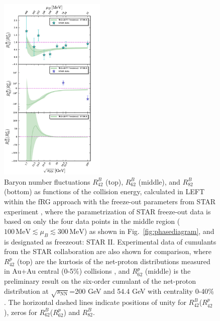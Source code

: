 \documentclass[%
reprint,
superscriptaddress,
showpacs,preprintnumbers,
 amsmath,amssymb,
 aps,
prd,
]{revtex4-1}
\def\Fig#1{Fig.~\ref{#1}} \def\Tab#1{Tab.~\ref{#1}}
\begin{document}
%
\begin{figure}[t]
\includegraphics[width=0.45\textwidth]{Rm2-sqrtS2}
\caption{Baryon number fluctuations $R^{B}_{42}$ (top), $R^{B}_{62}$ (middle), and $R^{B}_{82}$ (bottom) as functions of the collision energy, calculated in LEFT within the fRG approach with the freeze-out parameters from STAR experiment \cite{Adamczyk:2017iwn}, where the parametrization of STAR freeze-out data is based on only the four data points in the middle region ($100\,\mathrm{MeV}\lesssim\mu_B\lesssim 300\,\mathrm{MeV}$) as shown in \Fig{fig:phasediagram}, and is designated as freezeout: STAR II. Experimental data of cumulants from the STAR collaboration are also shown for comparison, where $R^{p}_{42}$ (top) are the kurtosis of the net-proton distributions measured in Au+Au central (0-5\%) collisions \cite{Adam:2020unf}, and $R^{p}_{62}$ (middle) is the preliminary result on the six-order cumulant of the net-proton distribution at $\sqrt{s_{\mathrm{NN}}}$=200 GeV and 54.4 GeV with centrality 0-40\% \cite{Nonaka:2020crv,Pandav:2020uzx}. The horizontal dashed lines indicate positions of unity for $R^{B}_{42}$($R^{p}_{42}$), zeros for $R^{B}_{62}$($R^{p}_{62}$) and $R^{B}_{82}$.}\label{fig:Rm2-sqrtS2}\vspace{-0.5cm}
\end{figure}
%
\end{document}
